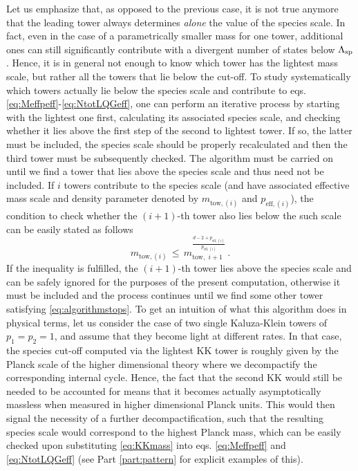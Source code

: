 Let us emphasize that, as opposed to the previous case, it is not true anymore that the leading tower always determines \emph{alone} the value of the species scale. In fact, even in the case of a parametrically smaller mass for one tower, additional ones can still significantly contribute with a divergent number of states below $\Lambda_{\text{sp}}$. Hence, it is in general not enough to know which tower has the lightest mass scale, but rather all the towers that lie below the cut-off. To study systematically which towers actually lie below the species scale and contribute to eqs. \eqref{eq:Meffpeff}-\eqref{eq:NtotLQGeff}, one can perform an iterative process by starting with the lightest one first, calculating its associated species scale, and checking whether it lies above the first step of the second to lightest tower. If so, the latter must be included, the species scale should be properly recalculated and then the third tower must be subsequently checked. The algorithm must be carried on until we find a tower that lies above the species scale and thus need not be included. If $i$ towers contribute to the species scale (and have associated effective mass scale and density parameter denoted by $m_{\text{tow,}\, (i)}$ and $p_{\text{eff,}\, (i)}$), the condition to check whether the $(i+1)$-th tower also lies below the such scale can be easily stated as follows
%
\begin{equation}\label{eq:algorithmstops}
		m_{\text {tow,}\, (i)}\, \leq\, m_{\text {tow, }\,  i+1}^{\frac{d-2+p_{\text{eff,}\, (i)}}{p_{\text{eff,}\, (i)}}}\, .
\end{equation}
%
If the inequality is fulfilled, the $(i+1)$-th tower lies above the species scale and can be safely ignored for the purposes of the present computation, otherwise it must be included and the process continues until we find some other tower satisfying \eqref{eq:algorithmstops}. To get an intuition of what this algorithm does in physical terms, let us consider the case of two single Kaluza-Klein towers of $p_1=p_2=1$, and assume that they become light at different rates. In that case, the species cut-off computed via the lightest KK tower is roughly given by the Planck scale of the higher dimensional theory where we decompactify the corresponding internal cycle. Hence, the fact that the second KK would still be needed to be accounted for means that it becomes actually asymptotically massless when measured in higher dimensional Planck units. This would then signal the necessity of a further decompactification, such that the resulting species scale would correspond to the highest Planck mass, which can be easily checked upon substituting \eqref{eq:KKmass} into eqs. \eqref{eq:Meffpeff} and \eqref{eq:NtotLQGeff} (see Part \ref{part:pattern} for explicit examples of this).

